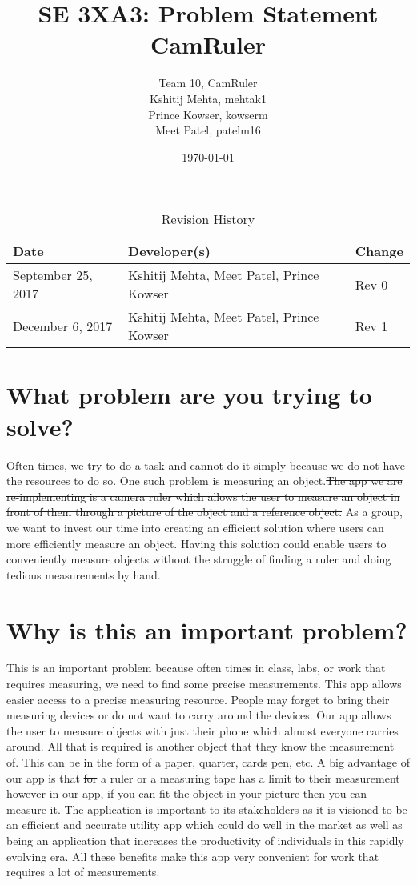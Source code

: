 \documentclass{article}
\title{SE 3XA3: Problem Statement\\CamRuler}
\author{Team 10, CamRuler
		\\ Kshitij Mehta, mehtak1
		\\ Prince Kowser, kowserm
		\\ Meet Patel, patelm16
}
\date{\today}
\begin{document}
\begin{table}[hp]
\caption{Revision History} \label{TblRevisionHistory}
\begin{tabularx}{\textwidth}{llX}
\toprule
\textbf{Date} & \textbf{Developer(s)} & \textbf{Change}\\
\midrule
September 25, 2017 & Kshitij Mehta, Meet Patel, Prince Kowser & Rev 0\\
\midrule
December 6, 2017 & Kshitij Mehta, Meet Patel, Prince Kowser & Rev 1\\
\bottomrule
\end{tabularx}
\end{table}

\newpage

\maketitle

\section{What problem are you trying to solve? }
Often times, we try to do a task and cannot do it simply because we do not have the resources to do so. One such problem is measuring an object.\sout{The app we are re-implementing is a camera ruler which allows the user to measure an object in front of them through a picture of the object and a reference object.} {\color{red}As a group, we want to invest our time into creating an efficient solution where users can more efficiently measure an object.} {\color{red}Having this solution could enable} users to conveniently measure objects without the struggle of finding a ruler and doing tedious measurements by hand. 

\section{Why is this an important problem?}
This is an important problem because often times in class, labs, or work that requires measuring, we need to find some precise measurements. This app allows easier access to a precise measuring resource. People may forget to bring their measuring devices or do not want to carry around the devices. Our app allows the user to measure objects with just their phone which almost everyone carries around. All that is required is another object that they know the measurement of. {\color{red} This can be in the form of} a paper, {\color{red}quarter, cards} pen, etc. A big advantage of our app is that \sout{for} a ruler or a measuring tape has a limit to their measurement however in our app, if you can fit the object in your picture then you can measure it. {\color{red}The application is important to its stakeholders as it is visioned to be an efficient and accurate utility app which could do well in the market as well as being an application that increases the productivity of individuals in this rapidly evolving era.} All these benefits make this app very convenient for work that requires a lot of measurements. 
\end{document}
